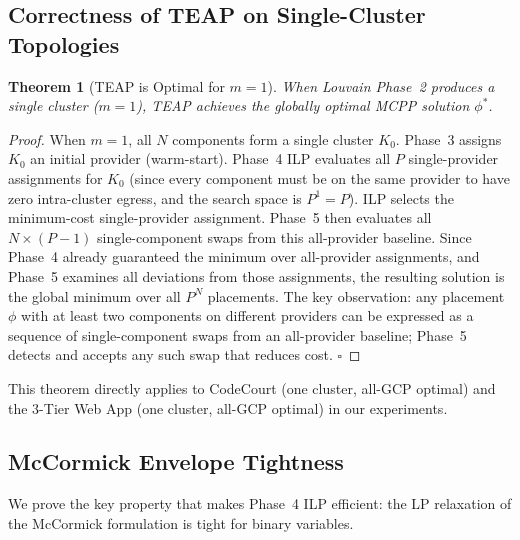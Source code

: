 \documentclass[10pt,journal]{IEEEtran}
\newtheorem{theorem}{Theorem}
\begin{document}
\subsection{Correctness of TEAP on Single-Cluster Topologies}

\begin{theorem}[TEAP is Optimal for $m=1$]\label{thm:single}
When Louvain Phase~2 produces a single cluster ($m=1$), TEAP achieves the
globally optimal MCPP solution $\phi^*$.
\end{theorem}
\begin{proof}
When $m=1$, all $N$ components form a single cluster $K_0$.
Phase~3 assigns $K_0$ an initial provider (warm-start).
Phase~4 ILP evaluates all $P$ single-provider assignments for $K_0$
(since every component must be on the same provider to have zero intra-cluster
egress, and the search space is $P^1 = P$).
ILP selects the minimum-cost single-provider assignment.
Phase~5 then evaluates all $N \times (P-1)$ single-component swaps from this
all-provider baseline.
Since Phase~4 already guaranteed the minimum over all-provider assignments, and
Phase~5 examines all deviations from those assignments, the resulting solution
is the global minimum over all $P^N$ placements.
The key observation: any placement $\phi$ with at least two components on different
providers can be expressed as a sequence of single-component swaps from an
all-provider baseline; Phase~5 detects and accepts any such swap that reduces cost.
\hfill$\square$
\end{proof}

This theorem directly applies to CodeCourt (one cluster, all-GCP optimal) and
the 3-Tier Web App (one cluster, all-GCP optimal) in our experiments.

\subsection{McCormick Envelope Tightness}

We prove the key property that makes Phase~4 ILP efficient: the LP relaxation
of the McCormick formulation is tight for binary variables.
\end{document}
